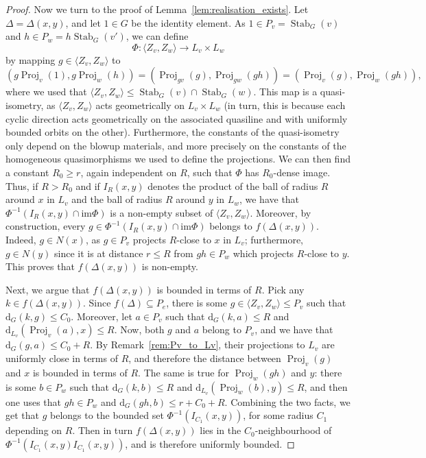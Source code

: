 \documentclass[svgnames]{amsart}
\theoremstyle{plain}
\theoremstyle{definition}
\newcommand{\dist}{\mathrm{d}}
\newcommand{\Stab}[2]{\operatorname{Stab}_{#1}(#2)}
\newcommand{\Proj}{\operatorname{Proj}}
\begin{document}
\begin{proof}
Now we turn to the proof of Lemma~\ref{lem:realisation_exists}. Let $\Delta=\Delta(x,y)$, and let $1\in G$ be the identity element. As $1\in P_v=\Stab{G}{v}$ and $h\in P_w= h\Stab{G}{v'}$, we can define
$$\Phi\colon \langle Z_v, Z_w\rangle \to L_v\times L_w$$
by mapping $g\in \langle Z_v, Z_w\rangle$ to 
$$( g\Proj_v(1), g\Proj_w(h))= (\Proj_{gv}(g), \Proj_{gw}(gh))=(\Proj_v(g), \Proj_w(gh)),$$
where we used that $\langle Z_v, Z_w\rangle\le \Stab{G}{v}\cap \Stab{G}{w}$.
This map is a quasi-isometry, as $\langle Z_v, Z_w\rangle $ acts geometrically on $ L_v\times L_w$ (in turn, this is because each cyclic direction acts geometrically on the associated quasiline and with uniformly bounded orbits on the other). Furthermore, the constants of the quasi-isometry only depend on the blowup materials, and more precisely on the constants of the homogeneous quasimorphisms we used to define the projections. We can then find a constant $R_0\ge r$, again independent on $R$, such that $\Phi$ has $R_0$-dense image. Thus, if $R> R_0$ and if $I_R(x,y)$ denotes the product of the ball of radius $R$ around $x$ in $L_v$ and the ball of radius $R$ around $y$ in $L_w$, we have that $\Phi^{-1}(I_R(x,y)\cap\text{im}\Phi)$ is a non-empty subset of  $\langle Z_v, Z_w\rangle$. Moreover, by construction, every $g\in \Phi^{-1}(I_R(x,y)\cap\text{im}\Phi)$ belongs to $f(\Delta(x,y))$. Indeed, $g\in N(x)$, as $g\in P_v$ projects $R$-close to $x$ in $L_v$; furthermore, $g\in N(y)$ since it is at distance $r\le R$ from $gh\in P_w$ which projects $R$-close to $y$. This proves that $f(\Delta(x,y))$ is non-empty.


    
\par\medskip
    Next, we argue that $f(\Delta(x,y))$ is bounded in terms of $R$. Pick any $k\in f(\Delta(x,y))$. Since $f(\Delta)\subseteq P_e$, there is some $g\in \langle Z_v, Z_w\rangle\le P_v$ such that $\dist_G(k,g)\le C_0$. Moreover, let $a\in P_v$ such that $\dist_G(k,a)\le R$ and $\dist_{L_v}(\Proj_v(a), x)\le R$. Now, both $g$ and $a$ belong to $P_v$, and we have that $\dist_G(g,a)\le C_0+R$. By Remark~\ref{rem:Pv_to_Lv}, their projections to $L_v$ are uniformly close in terms of $R$, and therefore the distance between $\Proj_v(g)$ and $x$ is bounded in terms of $R$. The same is true for $\Proj_w(gh)$ and $y$: there is some $b\in P_w$ such that $\dist_G(k,b)\le R$ and $\dist_{L_v}(\Proj_w(b), y)\le R$, and then one uses that $gh\in P_w$ and $\dist_{G}(gh,b)\le r+C_0+R$. Combining the two facts, we get that $g$ belongs to the bounded set $\Phi^{-1}(I_{C_1}(x,y))$, for some radius $C_1$ depending on $R$. Then in turn $f(\Delta(x,y))$ lies in the $C_0$-neighbourhood of $\Phi^{-1}(I_{C_1}(x,y)I_{C_1}(x,y))$, and is therefore uniformly bounded.


\end{proof}
\end{document}
